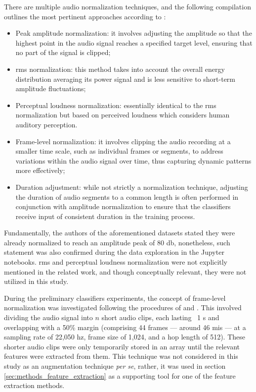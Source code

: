 There are multiple audio normalization techniques, and the following compilation outlines the most pertinent approaches according to \textcite{Mueller2021}:

 \begin{itemize}
    \item Peak amplitude normalization: it involves adjusting the amplitude so that the highest point in the audio signal reaches a specified target level, ensuring that no part of the signal is clipped;
    \item \gls{rms} normalization: this method takes into account the overall energy distribution averaging its power signal and is less sensitive to short-term amplitude fluctuations;
    \item Perceptual loudness normalization: essentially identical to the \gls{rms} normalization but based on perceived loudness which considers human auditory perception.
    \item Frame-level normalization: it involves clipping the audio recording at a smaller time scale, such as individual frames or segments, to address variations within the audio signal over time, thus capturing dynamic patterns more effectively;
    \item Duration adjustment: while not strictly a normalization technique, adjusting the duration of audio segments to a common length is often performed in conjunction with amplitude normalization to ensure that the classifiers receive input of consistent duration in the training process.
\end{itemize}

Fundamentally, the authors of the aforementioned datasets stated they were already normalized to reach an amplitude peak of 80 \gls{db}, nonetheless, such statement was also confirmed during the data exploration in the Jupyter notebooks. \gls{rms} and perceptual loudness normalization were not explicitly mentioned in the related work, and though conceptually relevant, they were not utilized in this study.

During the preliminary classifiers experiments, the concept of frame-level normalization was investigated following the procedures of \textcite{Silva2019} and \textcite{Lhoest2021}. This involved dividing the audio signal into $n$ short audio clips, each lasting ~1 \gls{s} and overlapping with a 50\% margin (comprising 44 frames — around 46 \gls{mi}\gls{s} — at a sampling rate of 22,050 \gls{hz}, frame size of 1,024, and a hop length of 512). These shorter audio clips were only temporarily stored in an array until the relevant features were extracted from them. This technique was not considered in this study as an augmentation technique \textit{per se}, rather, it was used in section \ref{sec:methods_feature_extraction} as a supporting tool for one of the feature extraction methods.

